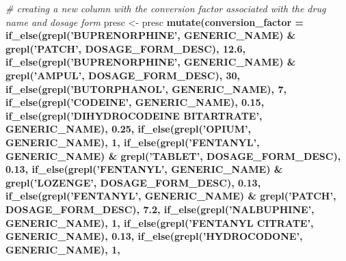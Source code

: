 \documentclass[]{article}
\newenvironment{Shaded}{\begin{snugshade}}{\end{snugshade}}
\newcommand{\KeywordTok}[1]{\textcolor[rgb]{0.13,0.29,0.53}{\textbf{#1}}}
\newcommand{\DataTypeTok}[1]{\textcolor[rgb]{0.13,0.29,0.53}{#1}}
\newcommand{\DecValTok}[1]{\textcolor[rgb]{0.00,0.00,0.81}{#1}}
\newcommand{\FloatTok}[1]{\textcolor[rgb]{0.00,0.00,0.81}{#1}}
\newcommand{\StringTok}[1]{\textcolor[rgb]{0.31,0.60,0.02}{#1}}
\newcommand{\CommentTok}[1]{\textcolor[rgb]{0.56,0.35,0.01}{\textit{#1}}}
\newcommand{\OperatorTok}[1]{\textcolor[rgb]{0.81,0.36,0.00}{\textbf{#1}}}
\newcommand{\NormalTok}[1]{#1}
\begin{document}
\begin{Shaded}
\begin{Highlighting}[]
{{{{{\CommentTok{# creating a new column with the conversion factor associated with the drug name and dosage form}
\NormalTok{presc <-}\StringTok{ }\NormalTok{presc }\OperatorTok{%>%}\StringTok{ }
\StringTok{  }\KeywordTok{mutate}\NormalTok{(}\DataTypeTok{conversion_factor =} 
    \KeywordTok{if_else}\NormalTok{(}\KeywordTok{grepl}\NormalTok{(}\StringTok{'BUPRENORPHINE'}\NormalTok{, GENERIC_NAME) }\OperatorTok{&}\StringTok{ }\KeywordTok{grepl}\NormalTok{(}\StringTok{'PATCH'}\NormalTok{, DOSAGE_FORM_DESC), }\FloatTok{12.6}\NormalTok{, }
    \KeywordTok{if_else}\NormalTok{(}\KeywordTok{grepl}\NormalTok{(}\StringTok{'BUPRENORPHINE'}\NormalTok{, GENERIC_NAME) }\OperatorTok{&}\StringTok{ }\KeywordTok{grepl}\NormalTok{(}\StringTok{'AMPUL'}\NormalTok{, DOSAGE_FORM_DESC), }\DecValTok{30}\NormalTok{,}
    \KeywordTok{if_else}\NormalTok{(}\KeywordTok{grepl}\NormalTok{(}\StringTok{'BUTORPHANOL'}\NormalTok{, GENERIC_NAME), }\DecValTok{7}\NormalTok{,}
    \KeywordTok{if_else}\NormalTok{(}\KeywordTok{grepl}\NormalTok{(}\StringTok{'CODEINE'}\NormalTok{, GENERIC_NAME), }\FloatTok{0.15}\NormalTok{,}
    \KeywordTok{if_else}\NormalTok{(}\KeywordTok{grepl}\NormalTok{(}\StringTok{'DIHYDROCODEINE BITARTRATE'}\NormalTok{, GENERIC_NAME), }\FloatTok{0.25}\NormalTok{,}
    \KeywordTok{if_else}\NormalTok{(}\KeywordTok{grepl}\NormalTok{(}\StringTok{'OPIUM'}\NormalTok{, GENERIC_NAME), }\DecValTok{1}\NormalTok{,}
    \KeywordTok{if_else}\NormalTok{(}\KeywordTok{grepl}\NormalTok{(}\StringTok{'FENTANYL'}\NormalTok{, GENERIC_NAME) }\OperatorTok{&}\StringTok{ }\KeywordTok{grepl}\NormalTok{(}\StringTok{'TABLET'}\NormalTok{, DOSAGE_FORM_DESC), }\FloatTok{0.13}\NormalTok{,}
    \KeywordTok{if_else}\NormalTok{(}\KeywordTok{grepl}\NormalTok{(}\StringTok{'FENTANYL'}\NormalTok{, GENERIC_NAME) }\OperatorTok{&}\StringTok{ }\KeywordTok{grepl}\NormalTok{(}\StringTok{'LOZENGE'}\NormalTok{, DOSAGE_FORM_DESC), }\FloatTok{0.13}\NormalTok{,}
    \KeywordTok{if_else}\NormalTok{(}\KeywordTok{grepl}\NormalTok{(}\StringTok{'FENTANYL'}\NormalTok{, GENERIC_NAME) }\OperatorTok{&}\StringTok{ }\KeywordTok{grepl}\NormalTok{(}\StringTok{'PATCH'}\NormalTok{, DOSAGE_FORM_DESC), }\FloatTok{7.2}\NormalTok{,}
    \KeywordTok{if_else}\NormalTok{(}\KeywordTok{grepl}\NormalTok{(}\StringTok{'NALBUPHINE'}\NormalTok{, GENERIC_NAME), }\DecValTok{1}\NormalTok{,}
    \KeywordTok{if_else}\NormalTok{(}\KeywordTok{grepl}\NormalTok{(}\StringTok{'FENTANYL CITRATE'}\NormalTok{, GENERIC_NAME), }\FloatTok{0.13}\NormalTok{,}
    \KeywordTok{if_else}\NormalTok{(}\KeywordTok{grepl}\NormalTok{(}\StringTok{'HYDROCODONE'}\NormalTok{, GENERIC_NAME), }\DecValTok{1}\NormalTok{,}
}}}}}}
\end{Highlighting}
\end{Shaded}
\end{document}
